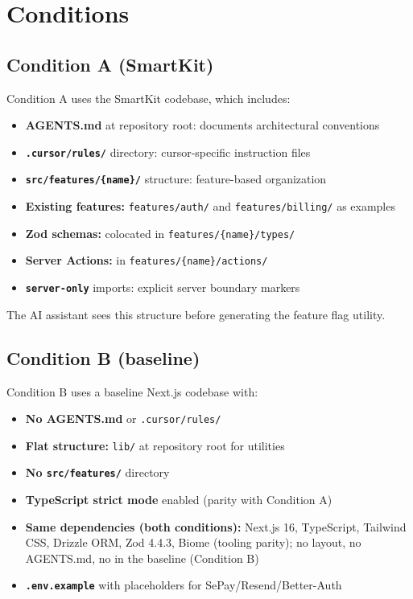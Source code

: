 
\section{Conditions}

\subsection{Condition A (SmartKit)}
\label{app:cond-a}

Condition A uses the SmartKit codebase, which includes:
\begin{itemize}
\item \textbf{AGENTS.md} at repository root: documents architectural conventions
\item \textbf{\texttt{.cursor/rules/}} directory: cursor-specific instruction files
\item \textbf{\texttt{src/features/\{name\}/}} structure: feature-based organization
\item \textbf{Existing features:} \texttt{features/auth/} and \texttt{features/billing/} as examples
\item \textbf{Zod schemas:} colocated in \texttt{features/\{name\}/types/}
\item \textbf{Server Actions:} in \texttt{features/\{name\}/actions/}
\item \textbf{\texttt{server-only}} imports: explicit server boundary markers
\end{itemize}

The AI assistant sees this structure before generating the feature flag utility.

\subsection{Condition B (baseline)}
\label{app:cond-b}

Condition B uses a baseline Next.js codebase with:
\begin{itemize}
\item \textbf{No AGENTS.md} or \texttt{.cursor/rules/}
\item \textbf{Flat structure:} \texttt{lib/} at repository root for utilities
\item \textbf{No \texttt{src/features/}} directory
\item \textbf{TypeScript strict mode} enabled (parity with Condition A)
\item \textbf{Same dependencies (both conditions):} Next.js 16, TypeScript, Tailwind CSS, Drizzle ORM, Zod 4.4.3, Biome (tooling parity); no  layout, no AGENTS.md, no  in the baseline (Condition B)
\item \textbf{\texttt{.env.example}} with placeholders for SePay/Resend/Better-Auth
\end{itemize}

